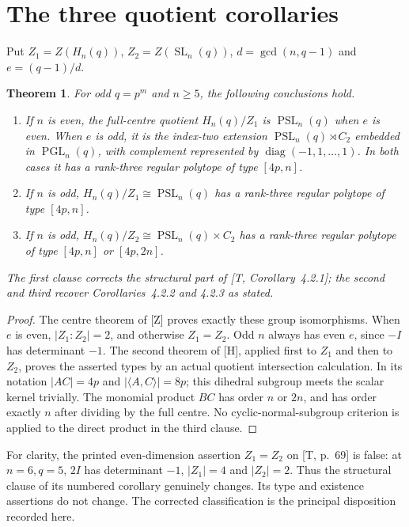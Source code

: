 \documentclass[11pt,a4paper]{article}
\newtheorem{theorem}{Theorem}
\newcommand{\SL}{\operatorname{SL}}
\newcommand{\PGL}{\operatorname{PGL}}
\newcommand{\PSL}{\operatorname{PSL}}
\begin{document}
\section{The three quotient corollaries}
Put $Z_1=Z(H_n(q))$, $Z_2=Z(\SL_n(q))$,
$d=\gcd(n,q-1)$ and $e=(q-1)/d$.
\begin{theorem}
For odd $q=p^m$ and $n\ge5$, the following conclusions hold.
\begin{enumerate}
\item If $n$ is even, the full-centre quotient $H_n(q)/Z_1$
is $\PSL_n(q)$ when $e$ is even. When $e$ is odd, it is the
index-two extension $\PSL_n(q)\rtimes C_2$ embedded in
$\PGL_n(q)$, with complement represented by
$\operatorname{diag}(-1,1,\ldots,1)$. In both cases it has a
rank-three regular polytope of type $[4p,n]$.
\item If $n$ is odd, $H_n(q)/Z_1\cong\PSL_n(q)$ has a
rank-three regular polytope of type $[4p,n]$.
\item If $n$ is odd, $H_n(q)/Z_2\cong\PSL_n(q)\times C_2$
has a rank-three regular polytope of type $[4p,n]$ or $[4p,2n]$.
\end{enumerate}
The first clause corrects the structural part of [T,
Corollary~4.2.1]; the second and third recover Corollaries~4.2.2
and 4.2.3 as stated.
\end{theorem}
\begin{proof}
The centre theorem of [Z] proves exactly these group isomorphisms.
When $e$ is even, $|Z_1:Z_2|=2$, and otherwise $Z_1=Z_2$.
Odd $n$ always has even $e$, since $-I$ has determinant $-1$.
The second theorem of [H], applied first to $Z_1$ and then to
$Z_2$, proves the asserted types by an actual quotient intersection
calculation. In its notation $|AC|=4p$ and
$|\langle A,C\rangle|=8p$; this dihedral subgroup meets the
scalar kernel trivially. The monomial product $BC$ has order
$n$ or $2n$, and has order exactly $n$ after dividing by the
full centre. No cyclic-normal-subgroup criterion is applied to
the direct product in the third clause.
\end{proof}

For clarity, the printed even-dimension assertion $Z_1=Z_2$
on [T, p.~69] is false: at $n=6,q=5$, $2I$ has determinant
$-1$, $|Z_1|=4$ and $|Z_2|=2$. Thus the structural clause
of its numbered corollary genuinely changes. Its type and existence
assertions do not change. The corrected classification is the
principal disposition recorded here.
\end{document}
